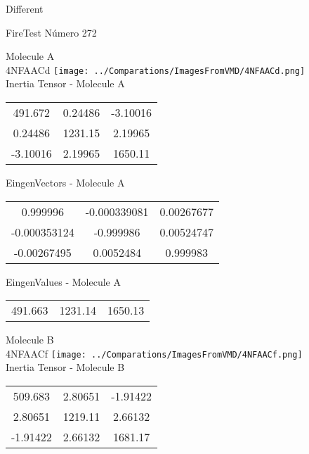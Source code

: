 \begin{center}
\vtab
\vtab
\textcolor{NavyBlue}{\Large Different}
\end{center}

 \newpage

\vtab[-2cm]
\begin{center}
{\large FireTest \tab Número 272}
\end{center}
\begin{multicols}{2}
\begin{center}

Molecule A \\ 
4NFAACd
\texttt{[image: ../Comparations/ImagesFromVMD/4NFAACd.png]}
\\
Inertia Tensor - Molecule A \\
\vtab

\begin{tabular}{|c c c|}
491.672	 & 	0.24486	 & 	-3.10016	 \\
0.24486	 & 	1231.15	 & 	2.19965	 \\
-3.10016	 & 	2.19965	 & 	1650.11
\end{tabular}

\vtab
 EingenVectors - Molecule A     \\
\vtab
\begin{tabular}{|c c c|}
0.999996	 & 	-0.000339081	 & 	0.00267677	 \\
-0.000353124	 & 	-0.999986	 & 	0.00524747	 \\
-0.00267495	 & 	0.0052484	 & 	0.999983
\end{tabular}

\vtab
 EingenValues - Molecule A     \\
\vtab
\begin{tabular}{|c c c|}
491.663	 & 	1231.14	 & 	1650.13	 \\
\end{tabular}
\columnbreak

Molecule B \\ 
4NFAACf
\texttt{[image: ../Comparations/ImagesFromVMD/4NFAACf.png]}
\\
Inertia Tensor - Molecule B \\
\vtab

\begin{tabular}{|c c c|}
509.683	 & 	2.80651	 & 	-1.91422	 \\
2.80651	 & 	1219.11	 & 	2.66132	 \\
-1.91422	 & 	2.66132	 & 	1681.17
\end{tabular}


\end{center}
\end{multicols}
